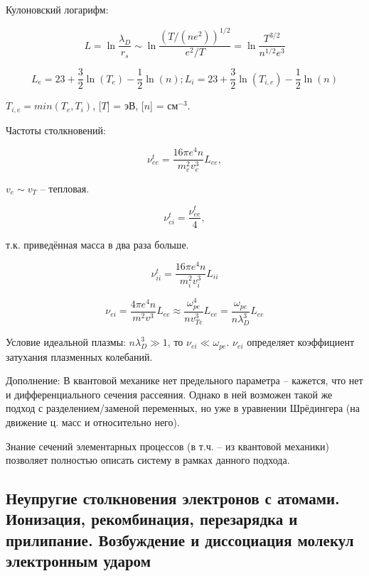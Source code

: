 \documentclass[10pt, a4paper]{article}
\begin{document}
Кулоновский логарифм:

\begin{equation*}
	L = \ln\frac{\lambda_D}{r_s} \sim \ln\frac{(T/(ne^2))^{1/2}}{e^2/T} = \ln\frac{T^{3/2}}{n^{1/2}e^3}
\end{equation*}

\begin{equation} \label{eq:Coulomb_log}
	L_e = 23+\frac{3}{2}\ln(T_e)-\frac{1}{2}\ln(n); L_i = 23+
	\frac{3}{2}\ln(T_{i,e})-\frac{1}{2}\ln(n)
\end{equation}

$T_{i,e} = min(T_e, T_i)$, [$T$] = эВ, [$n$] = см$^{-3}$.

Частоты столкновений:

\begin{equation} \label{eq:freq_ee}
	\nu_{ee}^t = \frac{16\pi e^4 n}{m_e^2v_e^3}L_{ee},
\end{equation}

$v_e\sim v_T$ -- тепловая.

\begin{equation} \label{eq:freq_ei}
	\nu_{ei}^t = \frac{\nu_{ee}^t}{4},
\end{equation}

т.к. приведённая масса в два раза больше.

\begin{equation} \label{eq:freq_ii}
	\nu_{ii}^t = \frac{16\pi e^4 n}{m_i^2v_i^3}L_{ii}
\end{equation}

\begin{equation*}
	\nu_{ei} = \frac{4\pi e^4 n}{m^2v^3}L_{ee} \approx \frac{\omega_{pe}^4}{nv_{Te}^3}L_{ee} = \frac{\omega_{pe}}{n\lambda_D^3}L_{ee}
\end{equation*}

Условие идеальной плазмы: $n\lambda_D^3 \gg 1$, то $\nu_{ei} \ll \omega_{pe}$. $\nu_{ei}$ определяет коэффициент затухания плазменных колебаний.

Дополнение: В квантовой механике нет предельного параметра -- кажется, что нет и дифференциального сечения рассеяния. Однако в ней возможен такой же подход с разделением/заменой переменных, но уже в уравнении Шрёдингера (на движение ц. масс и относительно него). 

Знание сечений элементарных процессов (в т.ч. -- из квантовой механики) позволяет полностью описать систему в рамках данного подхода.

\subsection{Неупругие столкновения электронов с атомами. Ионизация, рекомбинация, перезарядка и прилипание. Возбуждение и диссоциация молекул электронным ударом}
\end{document}
